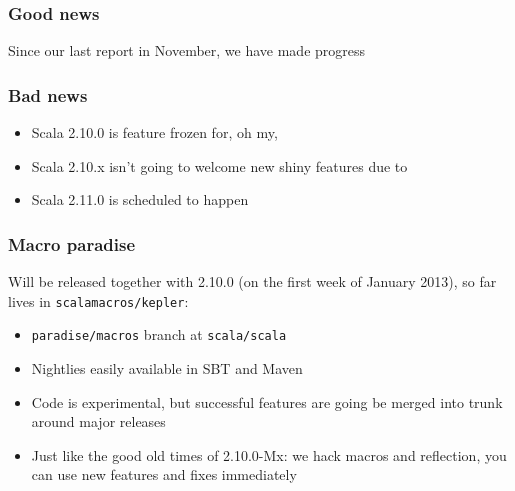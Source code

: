 \documentclass[svgnames,hyperref={bookmarks=false}]{beamer}
\begin{document}
\begin{frame}[fragile]
\frametitle{Good news}

Since our last report in November, we have made progress
\end{frame}

\begin{frame}[fragile]
\frametitle{Bad news}

\begin{itemize}
\item Scala 2.10.0 is feature frozen for, oh my, 
\item Scala 2.10.x isn't going to welcome new shiny features due to 
\item Scala 2.11.0 is scheduled to happen 
\end{itemize}
\end{frame}

\begin{frame}[fragile]
\frametitle{Macro paradise}

Will be released together with 2.10.0 (on the first week of January 2013), so far lives in \texttt{scalamacros/kepler}:

\begin{itemize}
\item \texttt{paradise/macros} branch at \texttt{scala/scala}
\item Nightlies easily available in SBT and Maven
\item Code is experimental, but successful features are going be merged into trunk around major releases
\item Just like the good old times of 2.10.0-Mx: we hack macros and reflection, you can use new features and fixes immediately
\end{itemize}
\end{frame}

\begin{frame}[fragile]
\frametitle{}

\vskip40pt
\begin{center}
\end{center}
\end{frame}
\end{document}
